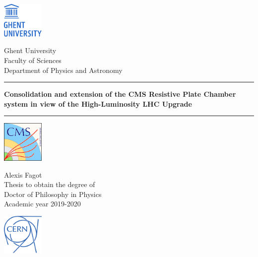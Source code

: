 \documentclass[10pt,a4paper,twoside,dutch,english,openright,leqno]{book}
\begin{document}
% 
 \thispagestyle{empty}   %
% 
 \noindent
 \begin{minipage}{3cm}%
   \href{https://www.ugent.be/}{\includegraphics*[width=2cm]{UGent.pdf}}
 \end{minipage}\hfill
 \begin{minipage}{8cm}
 \raggedleft
 \textsf{Ghent University\\
 Faculty of Sciences\\
 Department of Physics and Astronomy}
 \end{minipage}
\vspace{2cm}
% 
\bigskip
 \hrule
 \vspace{5mm}
   \begin{centering}
     \LARGE \textbf{\textsf{Consolidation and extension of the CMS Resistive Plate Chamber system in view of the High-Luminosity LHC Upgrade}}\\
   \end{centering}
 \vspace{5mm}
 \hrule
% 
 \vfill
 \begin{minipage}{2.0cm}%
     \href{https://cms.cern/}{\includegraphics*[width=2.0cm]{CMS.pdf}}
 \end{minipage}\hfill
 \begin{minipage}{7cm}
 \centering
 \LARGE\textsf{Alexis Fagot\\}
 \vspace{5mm}
 \normalsize\textsf{Thesis to obtain the degree of\\
 Doctor of Philosophy in Physics\\
 Academic year 2019-2020}
 \end{minipage}\hfill
 \begin{minipage}{2.0cm}%
     \href{https://home.cern/}{\includegraphics*[width=2.0cm]{CERN.pdf}}
 \end{minipage}\hfill
\end{document}
